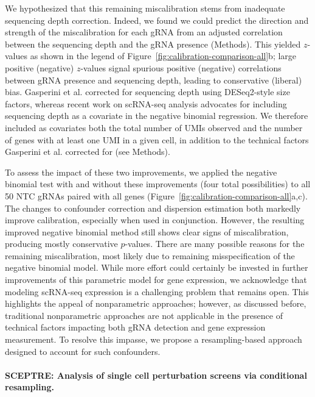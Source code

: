 \documentclass{nature}
\begin{document}
We hypothesized that this remaining miscalibration stems from inadequate sequencing depth correction. Indeed, we found we could predict the direction and strength of the miscalibration for each gRNA from an adjusted correlation between the sequencing depth and the gRNA presence (Methods). This yielded $z$-values as shown in the legend of Figure~\ref{fig:calibration-comparison-all}b; large positive (negative) $z$-values signal spurious positive (negative) correlations between gRNA presence and sequencing depth, leading to conservative (liberal) bias. Gasperini et al. corrected for sequencing depth using DESeq2-style size factors, whereas recent work on scRNA-seq analysis\cite{Hafemeister2019} advocates for including sequencing depth as a covariate in the negative binomial regression. We therefore included as covariates both the total number of UMIs observed and the number of genes with at least one UMI in a given cell, in addition to the technical factors Gasperini et al. corrected for (see Methods). 

To assess the impact of these two improvements, we applied the negative binomial test with and without these improvements (four total possibilities) to all 50 NTC gRNAs paired with all genes  (Figure~\ref{fig:calibration-comparison-all}a,c). The changes to confounder correction and dispersion estimation both markedly improve calibration, especially when used in conjunction. However, the resulting improved negative binomial method still shows clear signs of miscalibration, producing mostly conservative $p$-values. There are many possible reasons for the remaining miscalibration, most likely due to remaining misspecification of the negative binomial model. While more effort could certainly be invested in further improvements of this parametric model for gene expression, we acknowledge that modeling scRNA-seq expression is a challenging problem that remains open. This highlights the appeal of nonparametric approaches; however, as discussed before, traditional nonparametric approaches are not applicable in the presence of technical factors impacting both gRNA detection and gene expression measurement. To resolve this impasse, we propose a resampling-based approach designed to account for such confounders. 

\clearpage

\paragraph{SCEPTRE: Analysis of single cell perturbation screens via conditional resampling.} 
\end{document}
